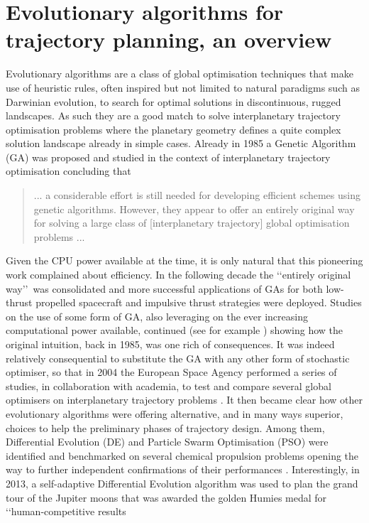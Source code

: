 \documentclass[graybox]{svmult}
\begin{document}
\section{Evolutionary algorithms for trajectory planning, an overview}
\label{sec:2}
Evolutionary algorithms are a class of global optimisation techniques that make use of heuristic rules, often inspired but not limited to natural paradigms such as Darwinian evolution, to search for optimal solutions in discontinuous, rugged landscapes. As such they are a good match to solve interplanetary trajectory optimisation problems where the planetary geometry defines a quite complex solution landscape already in simple cases. Already in 1985 a Genetic Algorithm (GA) \cite{janin1985genetic} was proposed and studied in the context of interplanetary trajectory optimisation concluding that 
\begin{quotation}
... a considerable effort is still needed for developing efficient schemes using genetic algorithms. However, they appear to offer an entirely original way for solving a large class of [interplanetary trajectory] global optimisation problems ...
\end{quotation}
Given the CPU power available at the time, it is only  natural that this pioneering work complained about efficiency. In the following decade the \lq\lq entirely original way\rq\rq\ was consolidated and more successful applications of GAs for both low-thrust propelled spacecraft \cite{rauwolf1996near} and impulsive thrust strategies \cite{gage1995interplanetary} were deployed. Studies on the use of some form of GA, also leveraging on the ever increasing computational power available, continued (see for example \cite{rogata2003guess, biesbroek2002optimization, gad2011hidden, deb2007interplanetary, elsayed2011ga}) showing how the original intuition, back in 1985, was one rich of consequences. It was indeed relatively consequential to substitute the GA with any other form of stochastic optimiser, so that in 2004 the European Space Agency performed a series of studies, in collaboration with academia, to test and compare several global optimisers on interplanetary trajectory problems \cite{ari1, ari2, izzo2007search}. It then became clear how other evolutionary algorithms were offering alternative, and in many ways superior, choices to help the preliminary phases of trajectory design. Among them, Differential Evolution (DE) and Particle Swarm Optimisation (PSO) were identified and benchmarked on several chemical propulsion problems opening the way to further independent confirmations of their performances \cite{vasile2010analysis, yao2017improved, olds2007interplanetary, sentinella2009hybrid, luo2005simulated, pontani2010particle}. Interestingly, in 2013, a self-adaptive Differential Evolution algorithm was used to plan the grand tour of the Jupiter moons that was awarded the golden Humies medal \cite{izzo2013search} for \lq\lq human-competitive results
\end{document}
